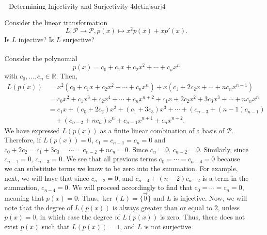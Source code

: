         \begin{example}{\Difficulty\,\Difficulty\,\Difficulty\,\,Determining Injectivity and Surjectivity 4}{detinjsurj4}

            Consider the linear transformation
            \begin{equation*}
                L:\mathcal{P}\to\mathcal{P},p(x)\mapsto x^2p(x)+xp'(x).
            \end{equation*}
            Is \(L\) injective? Is \(L\) surjective?
            \\
            \\
            Consider the polynomial
            \begin{equation*}
                p(x)=c_0+c_1x+c_2x^2+\cdots+c_nx^n
            \end{equation*}
            with \(c_0,\ldots,c_n\in\mathbb{R}\). Then,
            \begin{align*}
                L(p(x))&=x^2(c_0+c_1x+c_2x^2+\cdots+c_nx^n)+x(c_1+2c_2x+\cdots+nc_nx^{n-1}) \\
                &=c_0x^2+c_1x^3+c_2x^4+\cdots+c_nx^{n+2}+c_1x+2c_2x^2+3c_3x^3+\cdots+nc_nx^n \\
                &=c_1x+(c_0+2c_2)x^2+(c_1+3c_3)x^3+\cdots+(c_{n-3}+(n-1)c_{n-1})\\&\quad+(c_{n-2}+nc_n)x^n+c_{n-1}x^{n+1}+c_nx^{n+2}.
            \end{align*}
            We have expressed \(L(p(x))\) as a finite linear combination of a basis of \(\mathcal{P}\). Therefore, if \(L(p(x))=0\), \(c_1=c_{n-1}=c_n=0\) and \(c_0+2c_2=c_1+3c_3=\cdots=c_{n-2}+nc_n=0\). Since \(c_n=0\), \(c_{n-2}=0\). Similarly, since \(c_{n-1}=0\), \(c_{n-3}=0\). We see that all previous terms \(c_0=\cdots=c_{n-4}=0\) because we can substitute terms we know to be zero into the summation. For example, next, we will have that since \(c_{n-2}=0\), and \(c_{n-4}+(n-2)c_{n-2}\) is a term in the summation, \(c_{n-4}=0\). We will proceed accordingly to find that \(c_0=\cdots=c_n=0\), meaning that \(p(x)=0\). Thus, \(\ker(L)=\{\vec{0}\}\) and \(L\) is injective. Now, we will note that the degree of \(L(p(x))\) is always greater than or equal to \(2\), unless \(p(x)=0\), in which case the degree of \(L(p(x))\) is zero. Thus, there does not exist \(p(x)\) such that \(L(p(x))=1\), and \(L\) is not surjective.
        \end{example}
        \pagebreak
        \vphantom
        \\
        \\
